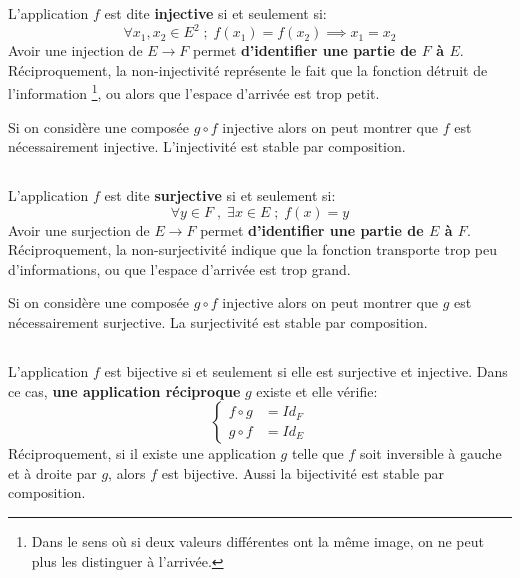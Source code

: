 L'application \(f\) est dite \textbf{injective} si et seulement si:
\[
    \forall x_1, x_2 \in E^2 \; ; \; f(x_1) = f(x_2) \implies x_1 = x_2 
\]
Avoir une injection de \( E \longrightarrow F \) permet \textbf{d'identifier une partie de \( F \) à \( E \)}. Réciproquement, la non-injectivité représente le fait que la fonction détruit de l'information \footnote[1]{Dans le sens où si deux valeurs différentes ont la même image, on ne peut plus les distinguer à l'arrivée.}, ou alors que l'espace d'arrivée est trop petit.\<

Si on considère une composée \(g \circ f\) injective alors on peut montrer que \(f\) est nécessairement injective. L'injectivité est stable par composition.
\subsection*{}

L'application \(f\) est dite \textbf{surjective} si et seulement si:
\[ 
    \forall y \in F \; , \; \exists x \in E \; ; \; f(x) = y
\]
Avoir une surjection de \( E \longrightarrow F \) permet \textbf{d'identifier une partie de \( E \) à \( F \)}. Réciproquement, la non-surjectivité indique que la fonction transporte trop peu d'informations, ou que l'espace d'arrivée est trop grand.\<

Si on considère une composée \(g \circ f\) injective alors on peut montrer que \(g\) est nécessairement surjective. La surjectivité est stable par composition.
\subsection*{}

L'application \(f\) est bijective si et seulement si elle est surjective et injective. Dans ce cas, \textbf{une application réciproque} \(g\) existe et elle vérifie:
\[
    \begin{cases}
        f \circ g &= Id_F \\
        g \circ f &= Id_E
    \end{cases}
\]
Réciproquement, si il existe une application \(g\) telle que \(f\) soit inversible à gauche et à droite par \(g\), alors \(f\) est bijective. Aussi la bijectivité est stable par composition.
